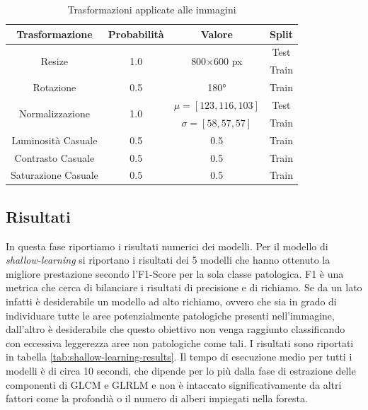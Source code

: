 \begin{table}
   \begin{tabular}[h]{||c|c|c|c||}
    \hline
    Trasformazione & Probabilità & Valore & Split \\ 
    \hline
    \hline
    \multirow{2}{*}{Resize} & \multirow{2}{*}{1.0} & \multirow{2}{*}{800$\times$600 px} & Test \\
    & & & Train \\
    \hline
    Rotazione & 0.5 & 180° & Train \\
    \hline
    \multirow{2}{*}{Normalizzazione} & \multirow{2}{*}{1.0} & $\mu = [123, 116, 103]$ & Test \\
    & & $\sigma = [58, 57, 57]$ & Train \\
    \hline
    Luminosità Casuale & 0.5 & 0.5 & Train \\
    \hline
    Contrasto Casuale & 0.5 & 0.5 & Train \\
    \hline
    Saturazione Casuale & 0.5 & 0.5 & Train \\
    \hline
   \end{tabular} 
   \caption{\label{tab:data-augmentation}Trasformazioni applicate alle immagini}
\end{table}


\subsection{\label{sec:results}Risultati}

In questa fase riportiamo i risultati numerici dei modelli.
Per il modello di {\it shallow-learning} si riportano
i risultati dei 5 modelli che hanno ottenuto la migliore
prestazione secondo l'F1-Score per la sola classe patologica.
F1 è una metrica che cerca di bilanciare i risultati di
precisione e di richiamo.
Se da un lato infatti è desiderabile un modello ad alto richiamo,
ovvero che sia in grado di individuare tutte le aree
potenzialmente patologiche presenti nell'immagine, dall'altro
è desiderabile che questo obiettivo non venga raggiunto
classificando con eccessiva leggerezza aree non patologiche
come tali.
I risultati sono riportati in tabella \ref{tab:shallow-learning-results}.
Il tempo di esecuzione medio per tutti i modelli è di circa 10 secondi,
che dipende per lo più dalla fase di estrazione delle componenti
di GLCM e GLRLM e non è intaccato significativamente da altri fattori
come la profondià o il numero di alberi impiegati nella foresta.

